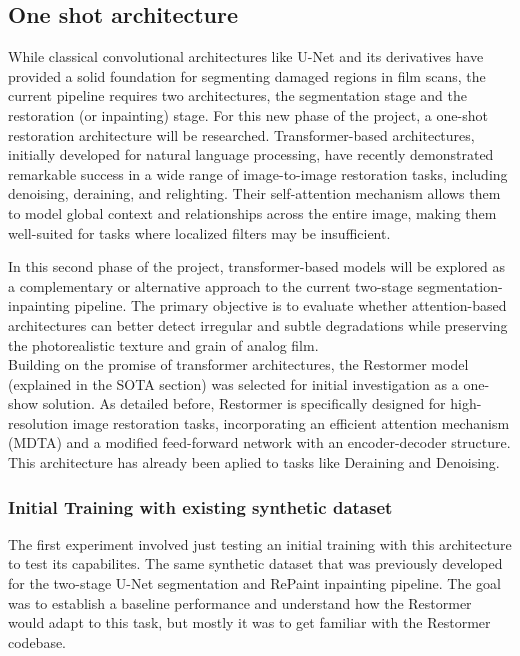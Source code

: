 \documentclass[openany, 12pt]{article}
\begin{document}
\subsection{One shot architecture}
While classical convolutional architectures like U-Net and its derivatives have provided a solid foundation for segmenting damaged regions in film scans, the current pipeline requires two architectures, the segmentation stage and the restoration (or inpainting) stage. For this new phase of the project, a one-shot restoration architecture will be researched. 
Transformer-based architectures, initially developed for natural language processing, have recently demonstrated remarkable success in a wide range of image-to-image restoration tasks, including denoising, deraining, and relighting. Their self-attention mechanism allows them to model global context and relationships across the entire image, making them well-suited for tasks where localized filters may be insufficient.

In this second phase of the project, transformer-based models will be explored as a complementary or alternative approach to the current two-stage segmentation-inpainting pipeline. The primary objective is to evaluate whether attention-based architectures can better detect irregular and subtle degradations while preserving the photorealistic texture and grain of analog film.\\

Building on the promise of transformer architectures, the Restormer model (explained in the SOTA section) was selected for initial investigation as a one-show solution. As detailed before, Restormer is specifically designed for high-resolution image restoration tasks, incorporating an efficient attention mechanism (MDTA) and a modified feed-forward network with an encoder-decoder structure. This architecture has already been aplied to tasks like Deraining and Denoising.
\subsubsection{Initial Training with existing synthetic dataset}
The first experiment involved just testing an initial training with this architecture to test its capabilites. The same synthetic dataset that was previously developed for the two-stage U-Net segmentation and RePaint inpainting pipeline. The goal was to establish a baseline performance and understand how the Restormer would adapt to this task, but mostly it was to get familiar with the Restormer codebase. 
\end{document}
